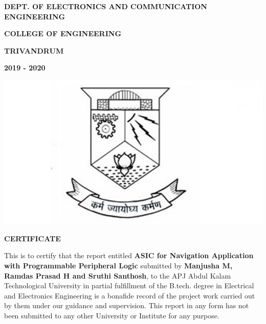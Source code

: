 \documentclass[12pt,a4paper]{report}
\begin{document}
\thispagestyle{empty}
\newpage
\begin{center}


\textbf{DEPT. OF ELECTRONICS AND COMMUNICATION ENGINEERING}

\textbf{COLLEGE OF ENGINEERING}

\textbf{TRIVANDRUM}

\textbf{2019 - 2020}
\end{center}
\begin{center}
\includegraphics[scale=0.4]{CET_logo.jpeg}

\end{center}
\begin{center}
 \textbf{\large{CERTIFICATE}}
\end{center}
 
This is to certify that the report entitled \textbf{ \large ASIC for Navigation Application with Programmable Peripheral Logic} submitted by \textbf{Manjusha M, Ramdas Prasad H and Sruthi Santhosh}, to the APJ Abdul Kalam Technological University in partial fulfillment of the B.tech. degree in Electrical and Electronics Engineering is a bonafide record of the project work carried out by them under our
guidance and supervision. This report in any form has not been submitted to any other University or Institute for any purpose.
\end{document}
